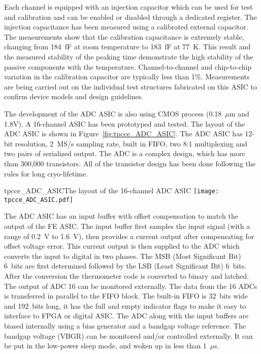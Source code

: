 Each channel is equipped with an injection capacitor which can be used
for test and calibration and can be enabled or disabled through a
dedicated register. The injection capacitance has been measured using 
a calibrated external capacitor. The measurements show
that the calibration capacitance is extremely stable, changing from
184~fF at room temperature to 183~fF at 77~K. This result and the measured
stability of the peaking time demonstrate the high stability of the
passive components with the temperature. Channel-to-channel and chip-to-chip
variation in the calibration capacitor are typically less than 1\%. Measurements are being carried
out on the individual test structures fabricated on this ASIC to
confirm device models and design guidelines.

The development of the ADC ASIC is also using CMOS process (0.18~$\mu$m and 1.8V).
A 16-channel ASIC has been prototyped and tested.
The layout of the ADC ASIC is shown in Figure~\ref{fig:tpcce_ADC_ASIC}. 
The ADC ASIC has 12-bit resolution, 2~MS/s sampling rate, built in FIFO, two 8:1 multiplexing and two pairs of serialized output.
The ADC is a complex design, which has more than 300,000 transistors.
All of the transistor design has been done following the rules for long cryo-lifetime.

\begin{cdrfigure}{tpcce_ADC_ASIC}{The layout of the 16-channel ADC ASIC}
\texttt{[image: tpcce\_ADC\_ASIC.pdf]} %
\end{cdrfigure}

The ADC ASIC has an input buffer with offset compensation to match the output of the FE ASIC.
The input buffer first samples the input signal (with a range of 0.2~V to 1.6~V),
then provides a current output after compensating for offset voltage error.
This current output is then supplied to the ADC which converts the input to digital in two phases.
The MSB (Most Significant Bit) 6~bits are first determined followed by the LSB (Least Significant Bit) 6~bits.
After the conversion the thermometer code is converted to binary and latched.
The output of ADC 16 can be monitored externally.
The data from the 16 ADCs is transferred in parallel to the FIFO block.
The built-in FIFO is 32~bits wide and 192~bits long,
it has the full and empty indicator flags to make it easy to interface to FPGA or digital ASIC.
The ADC along with the input buffers are biased internally using a bias generator and a bandgap voltage reference.
The bandgap voltage (VBGR) can be monitored and/or controlled externally.
It can be put in the low-power sleep mode, and woken up in less than 1~$\mu$s.

